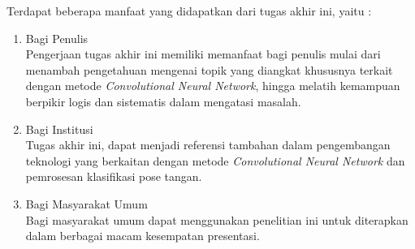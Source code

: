 Terdapat beberapa manfaat yang didapatkan dari tugas akhir ini, yaitu :

\begin{enumerate}[nolistsep]

  \item Bagi Penulis
  \mbox{}\\Pengerjaan tugas akhir ini memiliki memanfaat bagi penulis mulai dari menambah pengetahuan mengenai topik yang diangkat khususnya terkait dengan metode \emph{Convolutional Neural Network}, hingga melatih kemampuan berpikir logis dan sistematis dalam mengatasi masalah.
  \newpage
  \item Bagi Institusi
  \mbox{}\\Tugas akhir ini, dapat menjadi referensi tambahan dalam pengembangan teknologi yang berkaitan dengan metode \emph{Convolutional Neural Network} dan pemrosesan klasifikasi pose tangan.
  \item Bagi Masyarakat Umum
  \mbox{}\\Bagi masyarakat umum dapat menggunakan penelitian ini untuk diterapkan dalam berbagai macam kesempatan presentasi.

\end{enumerate}


